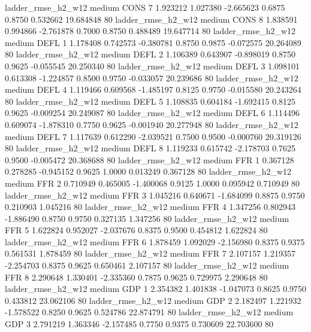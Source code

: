     ladder_rmse_h2_w12     medium     CONS                 7  1.923212 1.027380 -2.665623 0.6875 0.8750  0.532662   19.684848 80
    ladder_rmse_h2_w12     medium     CONS                 8  1.838591 0.994866 -2.761878 0.7000 0.8750  0.488489   19.647714 80
    ladder_rmse_h2_w12     medium     DEFL                 1  1.178408 0.742573 -0.380781 0.8750 0.9875 -0.072575   20.264089 80
    ladder_rmse_h2_w12     medium     DEFL                 2  1.106389 0.643907 -0.898019 0.8750 0.9625 -0.055545   20.250340 80
    ladder_rmse_h2_w12     medium     DEFL                 3  1.098101 0.613308 -1.224857 0.8500 0.9750 -0.033057   20.239686 80
    ladder_rmse_h2_w12     medium     DEFL                 4  1.119466 0.609568 -1.485197 0.8125 0.9750 -0.015580   20.243264 80
    ladder_rmse_h2_w12     medium     DEFL                 5  1.108835 0.604184 -1.692415 0.8125 0.9625 -0.009254   20.249087 80
    ladder_rmse_h2_w12     medium     DEFL                 6  1.114496 0.609074 -1.878310 0.7750 0.9625 -0.001940   20.277948 80
    ladder_rmse_h2_w12     medium     DEFL                 7  1.117639 0.612290 -2.039521 0.7500 0.9500 -0.000760   20.319126 80
    ladder_rmse_h2_w12     medium     DEFL                 8  1.119233 0.615742 -2.178703 0.7625 0.9500 -0.005472   20.368688 80
    ladder_rmse_h2_w12     medium      FFR                 1  0.367128 0.278285 -0.945152 0.9625 1.0000  0.013249    0.367128 80
    ladder_rmse_h2_w12     medium      FFR                 2  0.710949 0.465005 -1.400068 0.9125 1.0000  0.095942    0.710949 80
    ladder_rmse_h2_w12     medium      FFR                 3  1.045216 0.640671 -1.684099 0.8875 0.9750  0.210903    1.045216 80
    ladder_rmse_h2_w12     medium      FFR                 4  1.347256 0.802943 -1.886490 0.8750 0.9750  0.327135    1.347256 80
    ladder_rmse_h2_w12     medium      FFR                 5  1.622824 0.952027 -2.037676 0.8375 0.9500  0.454812    1.622824 80
    ladder_rmse_h2_w12     medium      FFR                 6  1.878459 1.092029 -2.156980 0.8375 0.9375  0.561531    1.878459 80
    ladder_rmse_h2_w12     medium      FFR                 7  2.107157 1.219357 -2.254703 0.8375 0.9625  0.650461    2.107157 80
    ladder_rmse_h2_w12     medium      FFR                 8  2.290648 1.330401 -2.335360 0.7875 0.9625  0.729975    2.290648 80
    ladder_rmse_h2_w12     medium      GDP                 1  2.354382 1.401838 -1.047073 0.8625 0.9750  0.433812   23.062106 80
    ladder_rmse_h2_w12     medium      GDP                 2  2.182497 1.221932 -1.578522 0.8250 0.9625  0.524786   22.874791 80
    ladder_rmse_h2_w12     medium      GDP                 3  2.791219 1.363346 -2.157485 0.7750 0.9375  0.730609   22.703600 80
